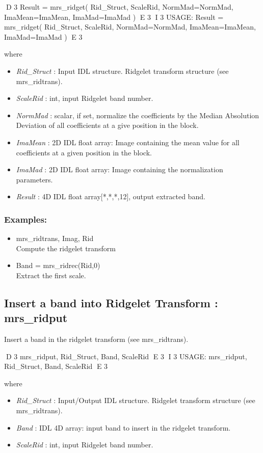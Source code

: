 {\bf
\begin{center}
D 3
     Result = mrs\_ridget( Rid\_Struct, ScaleRid, NormMad=NormMad, ImaMean=ImaMean, ImaMad=ImaMad ) 
E 3
I 3
     USAGE: Result = mrs\_ridget( Rid\_Struct, ScaleRid, NormMad=NormMad, ImaMean=ImaMean, ImaMad=ImaMad ) 
E 3
\end{center}}
where
\begin{itemize}
\item {\em Rid\_Struct} : Input IDL structure. Ridgelet transform structure (see mrs\_ridtrans).
\item {\em ScaleRid} : int, input Ridgelet band number.
\item {\em NormMad} : scalar, if set, normalize the coefficients by the Median Absolution Deviation of all coefficients at a give position in the block.
\item {\em ImaMean} : 2D IDL float array: Image containing the mean value for all coefficients at a given position in the block.
\item {\em ImaMad} : 2D IDL float array: Image containing  the normalization parameters.
\item {\em Result} : 4D IDL float array[*,*,*,12], output extracted band.
\end{itemize}

\subsubsection*{Examples:} 
\begin{itemize}
\item mrs\_ridtrans, Imag, Rid   \\
Compute the ridgelet transform
\item Band = mrs\_ridrec(Rid,0) \\
Extract the first scale.
\end{itemize}



\subsection{Insert a band into Ridgelet Transform : mrs\_ridput}
Insert a band in the ridgelet transform (see mrs\_ridtrans).   
{\bf
\begin{center}
D 3
      mrs\_ridput, Rid\_Struct, Band, ScaleRid
E 3
I 3
      USAGE: mrs\_ridput, Rid\_Struct, Band, ScaleRid
E 3
\end{center}}
where
\begin{itemize}
\item {\em Rid\_Struct} : Input/Output IDL structure. Ridgelet transform structure (see mrs\_ridtrans).
\item {\em Band} : IDL 4D array: input band to insert in the ridgelet transform.
\item {\em ScaleRid} : int, input Ridgelet band number.
\end{itemize}

